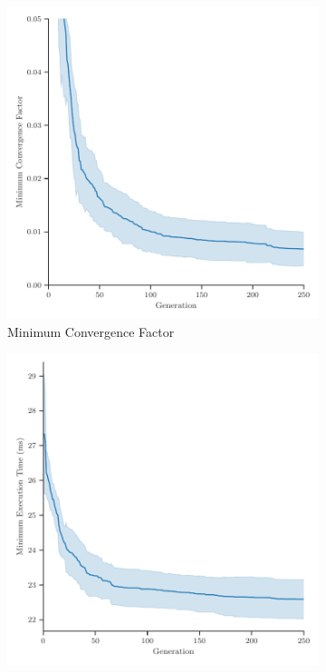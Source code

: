 \begin{figure}
	\centering
	\begin{subfigure}[b]{0.49\textwidth}
		\centering
		\includegraphics[width=\textwidth]{figures/minimum_convergence_factor_2D_FD_LinearElasticity_fromL2.pdf}
		\caption{Minimum Convergence Factor}
		\label{fig:linear-elasticity-2D-minimum-convergence-factor}
	\end{subfigure}
	\hfill
	\begin{subfigure}[b]{0.49\textwidth}
		\centering
		\includegraphics[width=\textwidth]{figures/minimum_execution_time_2D_FD_LinearElasticity_fromL2.pdf}

\end{subfigure}
\end{figure}
